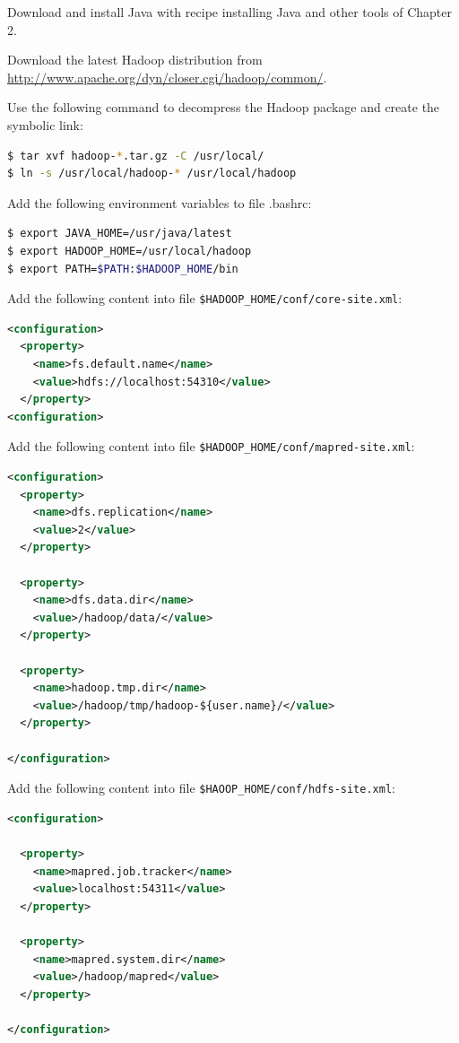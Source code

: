 Download and install Java with recipe installing Java and other tools of Chapter 2.

Download the latest Hadoop distribution from \url{http://www.apache.org/dyn/closer.cgi/hadoop/common/}.

Use the following command to decompress the Hadoop package and create the symbolic link:
\lstset{style=bashstyle}
\begin{lstlisting}[language=bash]
$ tar xvf hadoop-*.tar.gz -C /usr/local/
$ ln -s /usr/local/hadoop-* /usr/local/hadoop
\end{lstlisting}

Add the following environment variables to file .bashrc: 
\lstset{style=bashstyle}
\begin{lstlisting}[language=bash]
$ export JAVA_HOME=/usr/java/latest
$ export HADOOP_HOME=/usr/local/hadoop
$ export PATH=$PATH:$HADOOP_HOME/bin
\end{lstlisting}

Add the following content into file \verb|$HADOOP_HOME/conf/core-site.xml|:
\lstset{style=bashstyle}
\begin{lstlisting}[language=XML]
<configuration>
  <property>
    <name>fs.default.name</name>
    <value>hdfs://localhost:54310</value>
  </property>
<configuration>
\end{lstlisting}

Add the following content into file \verb|$HADOOP_HOME/conf/mapred-site.xml|:
\lstset{style=bashstyle}
\begin{lstlisting}[language=XML]
<configuration>
  <property>
    <name>dfs.replication</name>
    <value>2</value>
  </property>

  <property>
    <name>dfs.data.dir</name>
    <value>/hadoop/data/</value>
  </property>

  <property>
    <name>hadoop.tmp.dir</name>
    <value>/hadoop/tmp/hadoop-${user.name}/</value>
  </property>

</configuration>
\end{lstlisting}

Add the following content into file \verb|$HAOOP_HOME/conf/hdfs-site.xml|:
\lstset{style=bashstyle}
\begin{lstlisting}[language=XML]
<configuration>

  <property>
    <name>mapred.job.tracker</name>
    <value>localhost:54311</value>
  </property>

  <property>
    <name>mapred.system.dir</name>
    <value>/hadoop/mapred</value>
  </property>

</configuration>
\end{lstlisting}

